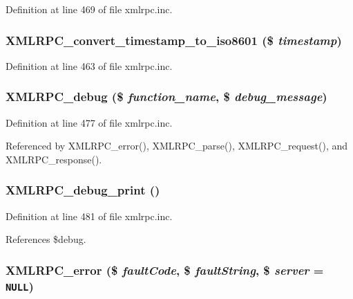Definition at line 469 of file xmlrpc.inc.\hypertarget{xmlrpc_8inc_4485d809c5d598949d9cfaca42bddf37}{
\subsubsection{\setlength{\rightskip}{0pt plus 5cm}XMLRPC\_\-convert\_\-timestamp\_\-to\_\-iso8601 (\$ {\em timestamp})}}
\label{xmlrpc_8inc_4485d809c5d598949d9cfaca42bddf37}




Definition at line 463 of file xmlrpc.inc.\hypertarget{xmlrpc_8inc_e2d2e97a8c1c560f5e96d58d60a02874}{
\subsubsection{\setlength{\rightskip}{0pt plus 5cm}XMLRPC\_\-debug (\$ {\em function\_\-name}, \$ {\em debug\_\-message})}}
\label{xmlrpc_8inc_e2d2e97a8c1c560f5e96d58d60a02874}




Definition at line 477 of file xmlrpc.inc.

Referenced by XMLRPC\_\-error(), XMLRPC\_\-parse(), XMLRPC\_\-request(), and XMLRPC\_\-response().\hypertarget{xmlrpc_8inc_8467f85edd385ddf2506b1bd5065a6d7}{
\subsubsection{\setlength{\rightskip}{0pt plus 5cm}XMLRPC\_\-debug\_\-print ()}}
\label{xmlrpc_8inc_8467f85edd385ddf2506b1bd5065a6d7}




Definition at line 481 of file xmlrpc.inc.

References \$debug.\hypertarget{xmlrpc_8inc_0cdc54b1376ccbbe412175c9819a95ac}{
\subsubsection{\setlength{\rightskip}{0pt plus 5cm}XMLRPC\_\-error (\$ {\em faultCode}, \$ {\em faultString}, \$ {\em server} = {\tt NULL})}}
\label{xmlrpc_8inc_0cdc54b1376ccbbe412175c9819a95ac}




